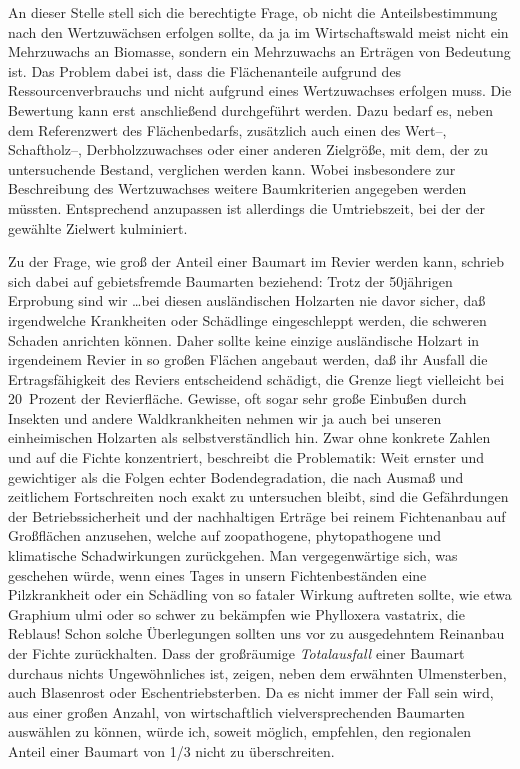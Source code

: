 \documentclass[twocolumn]{scrartcl}
\begin{document}
An dieser Stelle stell sich die berechtigte Frage, ob nicht die
Anteilsbestimmung nach den Wertzuwächsen erfolgen sollte, da ja im
Wirtschaftswald meist nicht ein Mehrzuwachs an Biomasse, sondern ein Mehrzuwachs
an Erträgen von Bedeutung ist. Das Problem dabei ist, dass die Flächenanteile
aufgrund des Ressourcenverbrauchs und nicht aufgrund eines Wertzuwachses
erfolgen muss. Die Bewertung kann erst anschließend durchgeführt werden. Dazu
bedarf es, neben dem Referenzwert des Flächenbedarfs, zusätzlich auch einen des
Wert--, Schaftholz--, Derbholzzuwachses oder einer anderen Zielgröße, mit dem,
der zu untersuchende Bestand, verglichen werden kann. Wobei insbesondere zur
Beschreibung des Wertzuwachses weitere Baumkriterien angegeben werden müssten.
Entsprechend anzupassen ist allerdings die Umtriebszeit, bei der der gewählte
Zielwert kulminiert.

Zu der Frage, wie groß der Anteil einer Baumart im Revier werden kann,
schrieb \citet[S.~233]{wiedemann1951Ertragskunde} sich dabei auf
gebietsfremde Baumarten beziehend: \frqq Trotz der 50jährigen
Erprobung sind wir \dots bei diesen ausländischen Holzarten nie davor
sicher, daß irgendwelche Krankheiten oder Schädlinge eingeschleppt
werden, die schweren Schaden anrichten können. Daher sollte keine
einzige ausländische Holzart in irgendeinem Revier in so großen
Flächen angebaut werden, daß ihr Ausfall die Ertragsfähigkeit des
Reviers entscheidend schädigt, die Grenze liegt vielleicht bei
20~Prozent der Revierfläche. Gewisse, oft sogar sehr große Einbußen
durch Insekten und andere Waldkrankheiten nehmen wir ja auch bei
unseren einheimischen Holzarten als selbstverständlich hin.\flqq{}
Zwar ohne konkrete Zahlen und auf die Fichte konzentriert, beschreibt
\citet[S.~394]{assmann1961Waldertraskunde} die Problematik: \frqq Weit
ernster und gewichtiger als die Folgen echter Bodendegradation, die
nach Ausmaß und zeitlichem Fortschreiten noch exakt zu untersuchen
bleibt, sind die Gefährdungen der Betriebssicherheit und der
nachhaltigen Erträge bei reinem Fichtenanbau auf Großflächen
anzusehen, welche auf zoopathogene, phytopathogene und klimatische
Schadwirkungen zurückgehen. Man vergegenwärtige sich, was geschehen
würde, wenn eines Tages in unsern Fichtenbeständen eine Pilzkrankheit
oder ein Schädling von so fataler Wirkung auftreten sollte, wie etwa
Graphium ulmi oder so schwer zu bekämpfen wie Phylloxera vastatrix,
die Reblaus! Schon solche Überlegungen sollten uns vor zu ausgedehntem
Reinanbau der Fichte zurückhalten.\flqq{} Dass der großräumige
\emph{Totalausfall} einer Baumart durchaus nichts Ungewöhnliches ist,
zeigen, neben dem erwähnten Ulmensterben, auch Blasenrost oder
Eschentriebsterben. Da es nicht immer der Fall sein wird, aus einer
großen Anzahl, von wirtschaftlich vielversprechenden Baumarten
auswählen zu können, würde ich, soweit möglich, empfehlen, den
regionalen Anteil einer Baumart von 1/3 nicht zu überschreiten.
\end{document}
